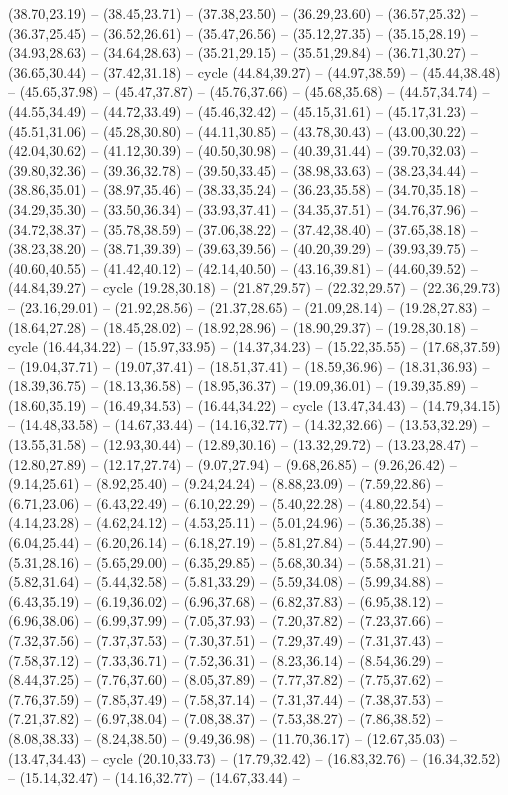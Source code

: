{(38.70,23.19) -- (38.45,23.71) -- (37.38,23.50) -- (36.29,23.60) -- (36.57,25.32) -- (36.37,25.45) -- (36.52,26.61) -- (35.47,26.56) -- (35.12,27.35) -- (35.15,28.19) -- (34.93,28.63) -- (34.64,28.63) -- (35.21,29.15) -- (35.51,29.84) -- (36.71,30.27) -- (36.65,30.44) -- (37.42,31.18) -- cycle (44.84,39.27) -- (44.97,38.59) -- (45.44,38.48) -- (45.65,37.98) -- (45.47,37.87) -- (45.76,37.66) -- (45.68,35.68) -- (44.57,34.74) -- (44.55,34.49) -- (44.72,33.49) -- (45.46,32.42) -- (45.15,31.61) -- (45.17,31.23) -- (45.51,31.06) -- (45.28,30.80) -- (44.11,30.85) -- (43.78,30.43) -- (43.00,30.22) -- (42.04,30.62) -- (41.12,30.39) -- (40.50,30.98) -- (40.39,31.44) -- (39.70,32.03) -- (39.80,32.36) -- (39.36,32.78) -- (39.50,33.45) -- (38.98,33.63) -- (38.23,34.44) -- (38.86,35.01) -- (38.97,35.46) -- (38.33,35.24) -- (36.23,35.58) -- (34.70,35.18) -- (34.29,35.30) -- (33.50,36.34) -- (33.93,37.41) -- (34.35,37.51) -- (34.76,37.96) -- (34.72,38.37) -- (35.78,38.59) -- (37.06,38.22) -- (37.42,38.40) -- (37.65,38.18) -- (38.23,38.20) -- (38.71,39.39) -- (39.63,39.56) -- (40.20,39.29) -- (39.93,39.75) -- (40.60,40.55) -- (41.42,40.12) -- (42.14,40.50) -- (43.16,39.81) -- (44.60,39.52) -- (44.84,39.27) -- cycle (19.28,30.18) -- (21.87,29.57) -- (22.32,29.57) -- (22.36,29.73) -- (23.16,29.01) -- (21.92,28.56) -- (21.37,28.65) -- (21.09,28.14) -- (19.28,27.83) -- (18.64,27.28) -- (18.45,28.02) -- (18.92,28.96) -- (18.90,29.37) -- (19.28,30.18) -- cycle (16.44,34.22) -- (15.97,33.95) -- (14.37,34.23) -- (15.22,35.55) -- (17.68,37.59) -- (19.04,37.71) -- (19.07,37.41) -- (18.51,37.41) -- (18.59,36.96) -- (18.31,36.93) -- (18.39,36.75) -- (18.13,36.58) -- (18.95,36.37) -- (19.09,36.01) -- (19.39,35.89) -- (18.60,35.19) -- (16.49,34.53) -- (16.44,34.22) -- cycle (13.47,34.43) -- (14.79,34.15) -- (14.48,33.58) -- (14.67,33.44) -- (14.16,32.77) -- (14.32,32.66) -- (13.53,32.29) -- (13.55,31.58) -- (12.93,30.44) -- (12.89,30.16) -- (13.32,29.72) -- (13.23,28.47) -- (12.80,27.89) -- (12.17,27.74) -- (9.07,27.94) -- (9.68,26.85) -- (9.26,26.42) -- (9.14,25.61) -- (8.92,25.40) -- (9.24,24.24) -- (8.88,23.09) -- (7.59,22.86) -- (6.71,23.06) -- (6.43,22.49) -- (6.10,22.29) -- (5.40,22.28) -- (4.80,22.54) -- (4.14,23.28) -- (4.62,24.12) -- (4.53,25.11) -- (5.01,24.96) -- (5.36,25.38) -- (6.04,25.44) -- (6.20,26.14) -- (6.18,27.19) -- (5.81,27.84) -- (5.44,27.90) -- (5.31,28.16) -- (5.65,29.00) -- (6.35,29.85) -- (5.68,30.34) -- (5.58,31.21) -- (5.82,31.64) -- (5.44,32.58) -- (5.81,33.29) -- (5.59,34.08) -- (5.99,34.88) -- (6.43,35.19) -- (6.19,36.02) -- (6.96,37.68) -- (6.82,37.83) -- (6.95,38.12) -- (6.96,38.06) -- (6.99,37.99) -- (7.05,37.93) -- (7.20,37.82) -- (7.23,37.66) -- (7.32,37.56) -- (7.37,37.53) -- (7.30,37.51) -- (7.29,37.49) -- (7.31,37.43) -- (7.58,37.12) -- (7.33,36.71) -- (7.52,36.31) -- (8.23,36.14) -- (8.54,36.29) -- (8.44,37.25) -- (7.76,37.60) -- (8.05,37.89) -- (7.77,37.82) -- (7.75,37.62) -- (7.76,37.59) -- (7.85,37.49) -- (7.58,37.14) -- (7.31,37.44) -- (7.38,37.53) -- (7.21,37.82) -- (6.97,38.04) -- (7.08,38.37) -- (7.53,38.27) -- (7.86,38.52) -- (8.08,38.33) -- (8.24,38.50) -- (9.49,36.98) -- (11.70,36.17) -- (12.67,35.03) -- (13.47,34.43) -- cycle (20.10,33.73) -- (17.79,32.42) -- (16.83,32.76) -- (16.34,32.52) -- (15.14,32.47) -- (14.16,32.77) -- (14.67,33.44) -- }
